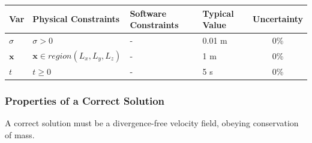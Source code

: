\documentclass[12pt]{article}
\begin{document}

\begin{table}[!h]
  \caption{Input Variables} \label{TblInputVar}
  \renewcommand{\arraystretch}{1.2}
\noindent \begin{longtable*}{l l l l c} 
  \toprule
  \textbf{Var} & \textbf{Physical Constraints} & \textbf{Software Constraints} &
                             \textbf{Typical Value} & \textbf{Uncertainty}\\
  \midrule 
    $\sigma$ & $\sigma > 0$ & - & 0.01 \si[per-mode=symbol] {\metre} & 0\%
  \\
    $\textbf{x}$ & $\textbf{x} \in region(L_x,L_y,L_z)$ & - & 1 \si[per-mode=symbol] {\metre} & 0\%
  \\
    $t$ & $t \geq 0$ & - & 5 \si[per-mode=symbol] {\second} & 0\%
  \\
  \bottomrule
\end{longtable*}
\end{table}

\noindent 


\subsubsection{Properties of a Correct Solution} \label{sec_CorrectSolution}

\noindent
A correct solution must be a divergence-free velocity field, obeying conservation of mass.
\end{document}
